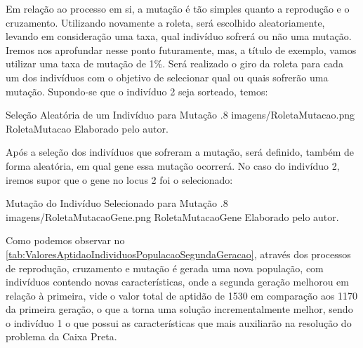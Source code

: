 Em relação ao processo em si, a mutação é tão simples quanto a reprodução e o cruzamento. Utilizando novamente a roleta, será escolhido aleatoriamente, levando em consideração uma taxa, qual indivíduo sofrerá ou não uma mutação. Iremos nos aprofundar nesse ponto futuramente, mas, a título de exemplo, vamos utilizar uma taxa de mutação de 1\%. Será realizado o giro da roleta para cada um dos indivíduos com o objetivo de selecionar qual ou quais sofrerão uma mutação. Supondo-se que o indivíduo 2 seja sorteado, temos:

 \figura
	{Seleção Aleatória de um Indivíduo para Mutação}
	{.8}
	{imagens/RoletaMutacao.png}
	{RoletaMutacao}
	{Elaborado pelo autor.}

Após a seleção dos indivíduos que sofreram a mutação, será definido, também de forma aleatória, em qual gene essa mutação ocorrerá. No caso do indivíduo 2, iremos supor que o gene no locus 2 foi o selecionado:

\figura
	{Mutação do Indivíduo Selecionado para Mutação}
	{.8}
	{imagens/RoletaMutacaoGene.png}
	{RoletaMutacaoGene}
	{Elaborado pelo autor.}

Como podemos observar no \autoref{tab:ValoresAptidaoIndividuosPopulacaoSegundaGeracao}, através dos processos de reprodução, cruzamento e mutação é gerada uma nova população, com indivíduos contendo novas características, onde a segunda geração melhorou em relação à primeira, vide o valor total de aptidão de 1530 em comparação aos 1170 da primeira geração, o que a torna uma solução incrementalmente melhor, sendo o indivíduo 1 o que possui as características que mais auxiliarão na resolução do problema da Caixa Preta.

